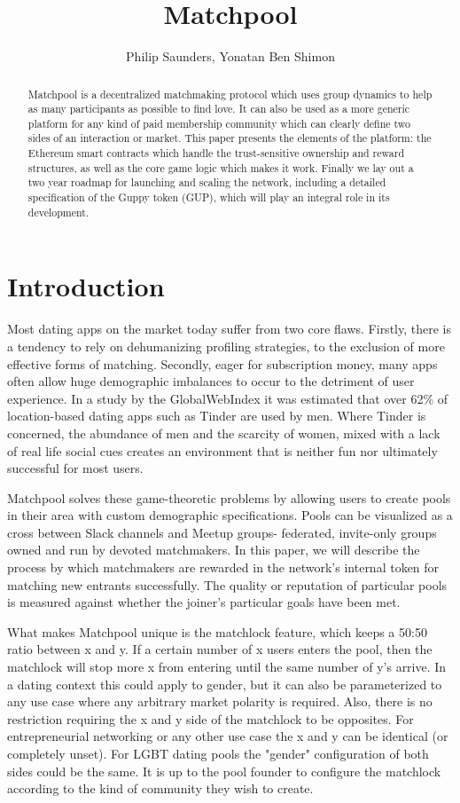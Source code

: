 \documentclass[a4paper]{article}
\title{Matchpool}
\author{Philip Saunders, Yonatan Ben Shimon}
\begin{document}
\maketitle
\begin{abstract}
Matchpool is a decentralized matchmaking protocol which uses group dynamics to help as many participants as possible to find love. It can also be used as a more generic platform for any kind of paid membership community which can clearly define two sides of an interaction or market. This paper presents the elements of the platform: the Ethereum smart contracts which handle the trust-sensitive ownership and reward structures, as well as the core game logic which makes it work. Finally we lay out a two year roadmap for launching and scaling the network, including a detailed specification of the Guppy token (GUP), which will play an integral role in its development.
\end{abstract}

\tableofcontents

\section{Introduction}

Most dating apps on the market today suffer from two core flaws. Firstly, there is a tendency to rely on dehumanizing profiling strategies, to the exclusion of more effective forms of matching. Secondly, eager for subscription money, many apps often allow huge demographic imbalances to occur to the detriment of user experience. In a study by the GlobalWebIndex it was estimated that over 62\% of location-based dating apps such as Tinder are used by men. Where Tinder is concerned, the abundance of men and the scarcity of women, mixed with a lack of real life social cues creates an environment that is neither fun nor ultimately successful for most users.

Matchpool solves these game-theoretic problems by allowing users to create pools in their area with custom demographic specifications. Pools can be visualized as a cross between Slack channels and Meetup groups- federated, invite-only groups owned and run by devoted matchmakers. In this paper, we will describe the process by which matchmakers are rewarded in the network's internal token for matching new entrants successfully. The quality or reputation of particular pools is measured against whether the joiner's particular goals have been met.

What makes Matchpool unique is the matchlock feature, which keeps a 50:50 ratio between x and y. If a certain number of x users enters the pool, then the matchlock will stop more x from entering until the same number of y’s arrive. In a dating context this could apply to gender, but it can also be parameterized to any use case where any arbitrary market polarity is required. Also, there is no restriction requiring the x and y side of the matchlock to be opposites. For entrepreneurial networking or any other use case the x and y can be identical (or completely unset). For LGBT dating pools the "gender" configuration of both sides could be the same. It is up to the pool founder to configure the matchlock according to the kind of community they wish to create.
\end{document}
